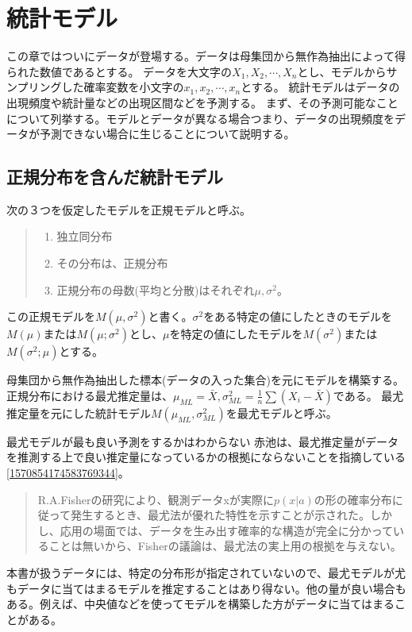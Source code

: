 \chapter{統計モデル}
この章ではついにデータが登場する。データは母集団から無作為抽出によって得られた数値であるとする。
データを大文字の$X_1,X_2,\cdots,X_n$とし、モデルからサンプリングした確率変数を小文字の$x_1,x_2,\cdots,x_n$とする。
統計モデルはデータの出現頻度や統計量などの出現区間などを予測する。
まず、その予測可能なことについて列挙する。モデルとデータが異なる場合つまり、データの出現頻度をデータが予測できない場合に生じることについて説明する。

\section{正規分布を含んだ統計モデル}
次の３つを仮定したモデルを正規モデルと呼ぶ。
\begin{quote}
    \begin{enumerate}[(1)]
    \item 独立同分布
    \item その分布は、正規分布
    \item 正規分布の母数(平均と分散)はそれぞれ$\mu,\sigma^2$。
    \end{enumerate}
\end{quote}
この正規モデルを$M(\mu,\sigma^2)$と書く。$\sigma^2$をある特定の値にしたときのモデルを$M(\mu)$または$M(\mu;\sigma^2)$とし、$\mu$を特定の値にしたモデルを$M(\sigma^2)$または$M(\sigma^2;\mu)$とする。

母集団から無作為抽出した標本(データの入った集合)を元にモデルを構築する。正規分布における最尤推定量は、$\mu_{ML}=\bar{X},\sigma^2_{ML}=\frac{1}{n}\sum(X_i-\bar{X})$である。
最尤推定量を元にした統計モデル$M(\mu_{ML},\sigma^2_{ML})$を最尤モデルと呼ぶ。

\begin{SMbox}{最尤モデルが最も良い予測をするかはわからない}
赤池は、最尤推定量がデータを推測する上で良い推定量になっているかの根拠にならないことを指摘している\ref{1570854174583769344}。
    \begin{quote}
    R.A.Fisherの研究により、観測データxが実際に$p(x|a)$の形の確率分布に従って発生するとき、最尤法が優れた特性を示すことが示された。しかし、応用の場面では、データを生み出す確率的な構造が完全に分かっていることは無いから、Fisherの議論は、最尤法の実上用の根拠を与えない。
    \end{quote}

    本書が扱うデータには、特定の分布形が指定されていないので、最尤モデルが尤もデータに当てはまるモデルを推定することはあり得ない。他の量が良い場合もある。例えば、中央値などを使ってモデルを構築した方がデータに当てはまることがある。
\end{SMbox}

